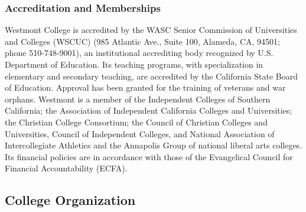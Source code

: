 \documentclass[letterpaper, 11pt]{article}
\begin{document}
\subsubsection{Accreditation and Memberships}
   Westmont College is accredited by the WASC Senior Commission of Universities and Colleges (WSCUC) (985 Atlantic Ave., Suite 100, Alameda, CA, 94501; phone 510-748-9001), an institutional accrediting body recognized by U.S. Department of Education.  Its teaching programs, with specialization in elementary and secondary teaching, are accredited by the California State Board of Education. Approval has been granted for the training of veterans and war orphans.
   Westmont is a member of the Independent Colleges of Southern California; the Association of Independent California Colleges and Universities; the Christian College Consortium; the Council of Christian Colleges and Universities, Council of Independent Colleges, and National Association of Intercollegiate Athletics and the Annapolis Group of national liberal arts colleges.  Its financial policies are in accordance with those of the Evangelical Council for Financial Accountability (ECFA).
\subsection{College Organization}
\end{document}
